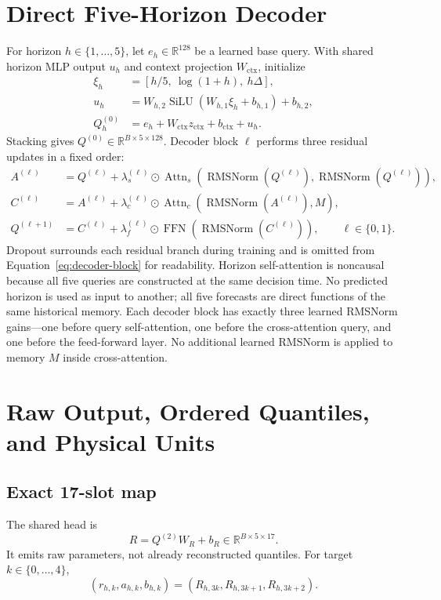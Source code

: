 \documentclass[10pt,letterpaper]{article}
\numberwithin{equation}{section}
\newcommand{\R}{\mathbb{R}}
\newcommand{\SiLU}{\operatorname{SiLU}}
\newcommand{\RMSNorm}{\operatorname{RMSNorm}}
\newcommand{\FFN}{\operatorname{FFN}}
\newcommand{\Attn}{\operatorname{Attn}}
\theoremstyle{definition}
\theoremstyle{remark}
\begin{document}
\section{Direct Five-Horizon Decoder}

For horizon $h\in\{1,\ldots,5\}$, let $e_h\in\R^{128}$ be a learned base
query. With shared horizon MLP output \(u_h\) and context projection
\(W_{\mathrm{ctx}}\), initialize
\begin{align}
\xi_h&=[h/5,\ \log(1+h),\ h\Delta],\nonumber\\
u_h&=W_{h,2}\SiLU(W_{h,1}\xi_h+b_{h,1})+b_{h,2},\nonumber\\
Q_h^{(0)}&=e_h+W_{\mathrm{ctx}}z_{\mathrm{ctx}}+b_{\mathrm{ctx}}+u_h.
\label{eq:horizon-query}
\end{align}
Stacking gives $Q^{(0)}\in\R^{B\times5\times128}$. Decoder block $\ell$
performs three residual updates in a fixed order:
\begin{align}
A^{(\ell)}&=Q^{(\ell)}+\lambda_s^{(\ell)}\odot
\Attn_s(\RMSNorm(Q^{(\ell)}),\RMSNorm(Q^{(\ell)})),\nonumber\\
C^{(\ell)}&=A^{(\ell)}+\lambda_c^{(\ell)}\odot
\Attn_c(\RMSNorm(A^{(\ell)}),M),\nonumber\\
Q^{(\ell+1)}&=C^{(\ell)}+\lambda_f^{(\ell)}\odot
\FFN(\RMSNorm(C^{(\ell)})),\qquad \ell\in\{0,1\}.
\label{eq:decoder-block}
\end{align}
Dropout surrounds each residual branch during training and is omitted from
Equation~\eqref{eq:decoder-block} for readability. Horizon self-attention is
noncausal because all five queries are constructed at the same decision time.
No predicted horizon is used as input to another; all five forecasts are direct
functions of the same historical memory. Each decoder block has exactly three
learned RMSNorm gains---one before query self-attention, one before the
cross-attention query, and one before the feed-forward layer. No additional
learned RMSNorm is applied to memory \(M\) inside cross-attention.

\section{Raw Output, Ordered Quantiles, and Physical Units}

\subsection{Exact 17-slot map}

The shared head is
\begin{equation}
R=Q^{(2)}W_R+b_R\in\R^{B\times5\times17}.
\label{eq:raw-head}
\end{equation}
It emits raw parameters, not already reconstructed quantiles. For target
$k\in\{0,\ldots,4\}$,
\begin{equation}
(r_{h,k},a_{h,k},b_{h,k})=
(R_{h,3k},R_{h,3k+1},R_{h,3k+2}).
\label{eq:raw-index}
\end{equation}
\end{document}
